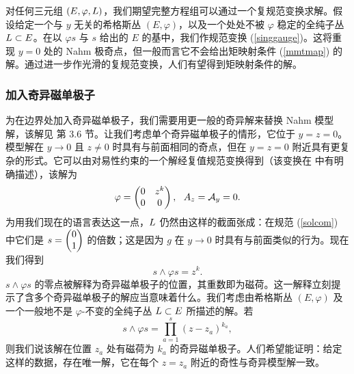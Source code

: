 对任何三元组 $(E,\varphi,{ L})$，我们期望完整方程组可以通过一个复规范变换求解。假设给定一个与 $y$ 无关的希格斯丛 $(E,\varphi)$，以及一个处处不被 $\varphi$ 稳定的全纯子丛 ${ L}\subset E$。在以 $\varphi s$ 与 $s$ 给出的 $E$ 的基中，我们作规范变换 (\ref{singgauge})。这将重现 $y=0$ 处的 Nahm 极奇点，但一般而言它不会给出矩映射条件 (\ref{mmtmap}) 的解。通过进一步作光滑的复规范变换，人们有望得到矩映射条件的解。

\subsubsection{加入奇异磁单极子}\label{addsing}

为在边界处加入奇异磁单极子，我们需要用更一般的奇异解来替换 Nahm 模型解，该解见 \cite{fiveknots} 第 3.6 节。让我们考虑单个奇异磁单极子的情形，它位于 $y=z=0$。模型解在 $y\to 0$ 且 $z\not=0$ 时具有与前面相同的奇点，但在 $y=z=0$ 附近具有更复杂的形式。它可以由对易性约束的一个解经复值规范变换得到（该变换在 \cite{fiveknots} 中有明确描述），该解为
\begin{equation}\label{solcom} \varphi=
\begin{pmatrix} 0 & z^k\cr 0 & 0 \end{pmatrix}, ~~A_z={\mathcal A}_y=0.
\end{equation}
为用我们现在的语言表达这一点，${ L}$ 仍然由这样的截面张成：在规范 (\ref{solcom}) 中它们是
$s=\begin{pmatrix} 0 \cr 1 \end{pmatrix}$ 的倍数；这是因为 $g$ 在 $y\to 0$ 时具有与前面类似的行为。现在我们得到
\begin{equation} s\wedge\varphi s = z^k.\end{equation}
$s\wedge\varphi s$ 的零点被解释为奇异磁单极子的位置，其重数即为磁荷。这一解释立刻提示了含多个奇异磁单极子的解应当意味着什么。我们考虑由希格斯丛 $(E,\varphi)$ 及一个一般地不是 $\varphi$-不变的全纯子丛 ${ L}\subset E$ 所描述的解。若
\begin{equation}\label{olcomtwo} s\wedge \varphi s =\prod_{a=1}^s(z-z_a)^{k_a},\end{equation}
则我们说该解在位置 $z_a$ 处有磁荷为 $k_a$ 的奇异磁单极子。人们希望能证明：给定这样的数据，存在唯一解，它在每个 $z=z_a$ 附近的奇性与奇异模型解一致。

